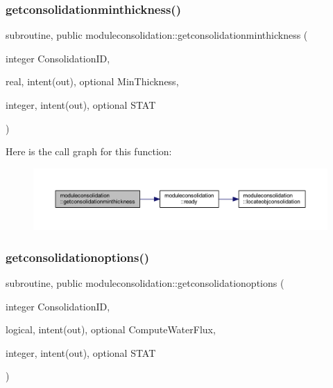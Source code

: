 \subsubsection{\texorpdfstring{getconsolidationminthickness()}{getconsolidationminthickness()}}
{\footnotesize\ttfamily subroutine, public moduleconsolidation\+::getconsolidationminthickness (\begin{DoxyParamCaption}\item[{integer}]{Consolidation\+ID,  }\item[{real, intent(out), optional}]{Min\+Thickness,  }\item[{integer, intent(out), optional}]{S\+T\+AT }\end{DoxyParamCaption})}

Here is the call graph for this function\+:\nopagebreak
\begin{figure}[H]
\begin{center}
\leavevmode
\includegraphics[width=350pt]{namespacemoduleconsolidation_a9166ecea6df370e3decee58c70761e72_cgraph}
\end{center}
\end{figure}
\mbox{\label{namespacemoduleconsolidation_a37aecd6313d74a8d082f6b77cd63bfef}} 
\subsubsection{\texorpdfstring{getconsolidationoptions()}{getconsolidationoptions()}}
{\footnotesize\ttfamily subroutine, public moduleconsolidation\+::getconsolidationoptions (\begin{DoxyParamCaption}\item[{integer}]{Consolidation\+ID,  }\item[{logical, intent(out), optional}]{Compute\+Water\+Flux,  }\item[{integer, intent(out), optional}]{S\+T\+AT }\end{DoxyParamCaption})}

